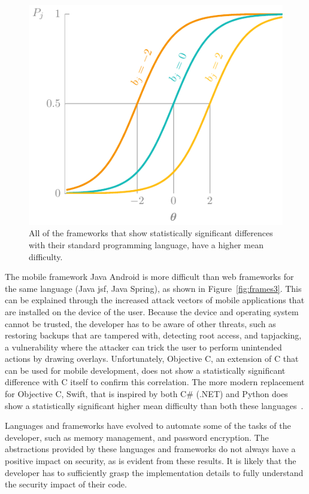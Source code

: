 \begin{figure}
    \centering
    \includegraphics[page=10]{03-education/figures/tikzfigures.pdf}
    \caption[Frameworks versus default languages]{All of the frameworks that show statistically significant differences with their standard programming language, have a higher mean difficulty.}
    \label{fig:frames2}
\end{figure}

The mobile framework Java Android is more difficult than web frameworks for the same language (Java \gls{jsf}, Java Spring), as shown in Figure~\ref{fig:frames3}.
This can be explained through the increased attack vectors of mobile applications that are installed on the device of the user.
Because the device and operating system cannot be trusted, the developer has to be aware of other threats, such as restoring backups that are tampered with, detecting root access, and tapjacking, a vulnerability where the attacker can trick the user to perform unintended actions by drawing overlays.
Unfortunately, Objective C, an extension of C that can be used for mobile development, does not show a statistically significant difference with C itself to confirm this correlation.
The more modern replacement for Objective C, Swift, that is inspired by both C\# (.NET) and Python does show a statistically significant higher mean difficulty than both these languages~\cite{nondot}.

Languages and frameworks have evolved to automate some of the tasks of the developer, such as memory management, and password encryption.
The abstractions provided by these languages and frameworks do not always have a positive impact on security, as is evident from these results.
It is likely that the developer has to sufficiently grasp the implementation details to fully understand the security impact of their code.

